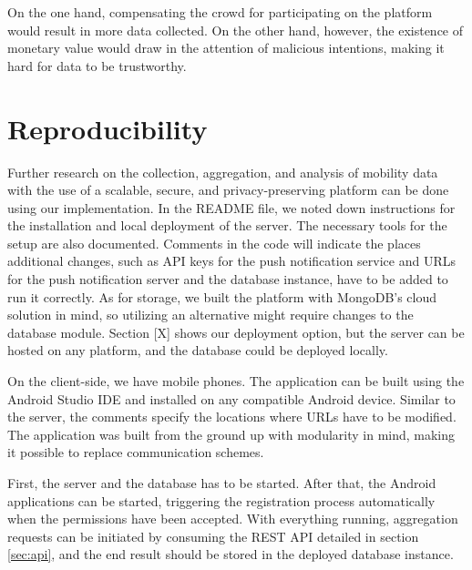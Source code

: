 On the one hand, compensating the crowd for participating on the platform would result in more data collected. On the other hand, however, the existence of monetary value would draw in the attention of malicious intentions, making it hard for data to be trustworthy.

\section{Reproducibility}
Further research on the collection, aggregation, and analysis of mobility data with the use of a scalable, secure, and privacy-preserving platform can be done using our implementation. In the README file, we noted down instructions for the installation and local deployment of the server. The necessary tools for the setup are also documented. Comments in the code will indicate the places additional changes, such as API keys for the push notification service and URLs for the push notification server and the database instance, have to be added to run it correctly. As for storage, we built the platform with MongoDB's cloud solution in mind, so utilizing an alternative might require changes to the database module. Section [X] shows our deployment option, but the server can be hosted on any platform, and the database could be deployed locally.

On the client-side, we have mobile phones. The application can be built using the Android Studio IDE and installed on any compatible Android device. Similar to the server, the comments specify the locations where URLs have to be modified. The application was built from the ground up with modularity in mind, making it possible to replace communication schemes.

First, the server and the database has to be started. After that, the Android applications can be started, triggering the registration process automatically when the permissions have been accepted. With everything running, aggregation requests can be initiated by consuming the REST API detailed in section \ref{sec:api}, and the end result should be stored in the deployed database instance.